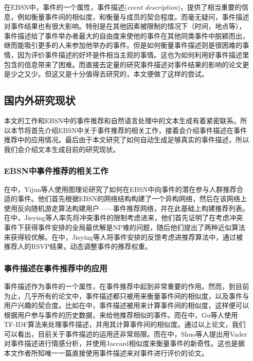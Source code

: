 在$\mathrm{EBSN}$中，事件的一个属性，事件描述(\textit{event description})，提供了相当重要的信息，例如衡量事件间的相似度，和衡量与成员的契合程度。而毫无疑问，事件描述对事件结果也有很大影响。特别是在其他因素被限制的情况下（时间，地点等），事件描述给了事件举办者最大的自由度来使他的事件在其他同类事件中脱颖而出，继而能吸引更多的人来参加他举办的事件。但是如何衡量事件描述则是很困难的事情，因为评价事件描述的好坏是件相当主观的事情。这也为如何利用好事件描述里包含的信息带来了困难。而直接去定量的研究事件描述对事件结果的影响的论文更是少之又少。但这又是十分值得去研究的，本文便做了这样的尝试。

\subsection{国内外研究现状}
本文的工作和EBSN中的事件推荐和自然语言处理中的文本生成有着紧密联系。所以本节将首先介绍EBSN中关于事件推荐的相关工作，接着会介绍事件描述在事件推荐中的应用情况。最后由于本文研究了如何自动生成足够真实的事件描述，所以我们会介绍文本生成目前的研究现状。
\subsubsection{EBSN中事件推荐的相关工作}
在中，Yijun等人使用图理论研究了如何在EBSN中向事件的潜在参与人群推荐合适的事件。他们首先根据EBSN的网络结构构建了一个异构网络，然后在该网络上使用反向随机游走算法构建用户——事件推荐网络，并在此基础上构建推荐列表。在中，Jieying等人率先将冲突事件的限制考虑进来，他们首先证明了在考虑冲突事件下获得事件安排的全局最优解是NP难的问题，随后他们提出了两种近似算法来获得较优解。在中，Jieying等人将事件安排的反馈考虑进推荐算法中，通过被推荐人的RSVP结果，动态调整事件的推荐权重。

\subsubsection{事件描述在事件推荐中的应用}
事件描述作为事件的一个属性，在事件推荐中起到非常重要的作用。然而，到目前为止，几乎所有的论文中，事件描述都只被用来衡量事件间的相似度，以及事件与用户兴趣的契合度。比如在中，事件描述被用来计算事件间的相似度，这样便可以根据用户参与事件的历史数据，来给他推荐相似的事件。而在中，Gu等人使用TF-IDF算法来处理事件描述，并用其计算事件间的相似度。通过以上论文，我们可以看出，目前关于事件描述的运用还非常局限。而在中，Shuo等人提出用Vader对事件描述进行情感分析，并使用Jaccard相似度来衡量事件的新奇性。这也是据本文作者所知唯一一篇直接使用事件描述来对事件进行评价的论文。

